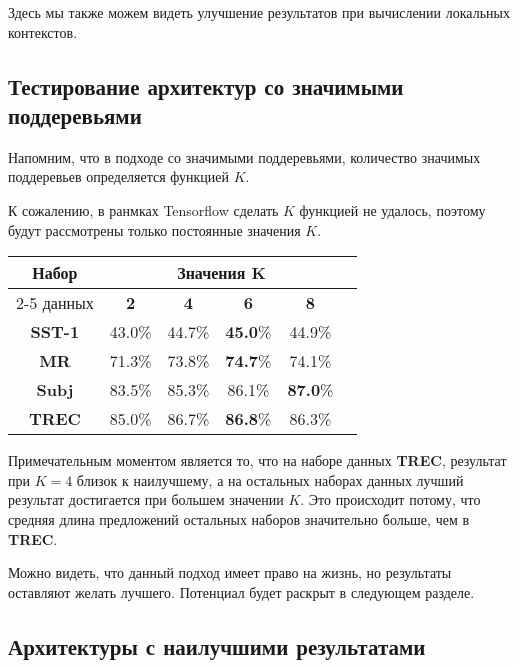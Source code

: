 Здесь мы также можем видеть улучшение результатов при вычислении локальных контекстов.

\subsection{Тестирование архитектур со значимыми поддеревьями}

Напомним, что в подходе со значимыми поддеревьями, количество значимых поддеревьев определяется функцией $K$.

К сожалению, в ранмках Tensorflow сделать $K$ функцией не удалось, поэтому будут рассмотрены только постоянные значения $K$.

\vspace{5mm}
\noindent \begin{minipage}{\linewidth}
 \label{tab:title} 
\begin{tabular}{|c|c|c|c|c|c|}
\hline
\multirow{2}{*}{Набор}   &  \multicolumn{4}{c|}{Значения K} \\ \cline{2-5} 
     данных              &  \textbf{2}  & \textbf{4}   & \textbf{6} & \textbf{8} \\ \hline
\textbf{SST-1}           & 43.0\%       &  44.7\% & \textbf{45.0}\% & 44.9\%     \\ \hline
\textbf{MR}              & 71.3\%       & 73.8\%  & \textbf{74.7}\% & 74.1\%     \\ \hline
\textbf{Subj}            & 83.5\%       & 85.3\%       & 86.1\%     & \textbf{87.0}\% \\ \hline
\textbf{TREC}            & 85.0\%       & 86.7\% & \textbf{86.8}\%     & 86.3\%     \\ \hline
\end{tabular}
\end{minipage}
\vspace{5mm}

Примечательным моментом является то, что на наборе данных \textbf{TREC}, результат при $K=4$ близок к наилучшему, а на остальных наборах данных лучший результат достигается при большем значении $K$.
Это происходит потому, что средняя длина предложений остальных наборов значительно больше, чем в \textbf{TREC}.

Можно видеть, что данный подход имеет право на жизнь, но результаты оставляют желать лучшего.
Потенциал  будет раскрыт в следующем разделе.

\subsection{Архитектуры с наилучшими результатами}


